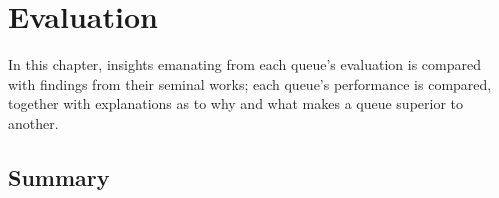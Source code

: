 \chapter{Evaluation}
In this chapter, insights emanating from each queue's evaluation is compared
with findings from their seminal works; each queue's performance is compared, 
together with explanations as to why and what makes a queue superior to another.

\section{Summary}